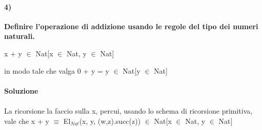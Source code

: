 \paragraph{4)}
\textbf{Definire l'operazione di addizione usando le regole del tipo dei numeri naturali.}
\begin{center} x + y $\in$ Nat[x $\in$ Nat, y $\in$ Nat]\end{center}
in modo tale che valga 0 + y = y $\in$  Nat[y $\in$ Nat]
\\\\
\textbf{Soluzione}\\\\
La ricorsione la faccio sulla x, percui, usando lo schema di ricorsione primitiva, vale che x + y $\equiv$ El$_{Nat}$(x, y, (w,z).succ(z)) $\in$ Nat[x $\in$ Nat, y $\in$ Nat]

